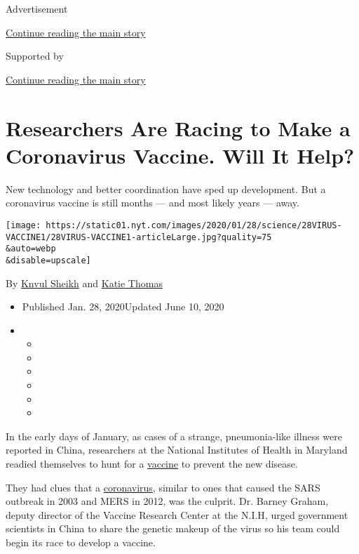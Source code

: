 Advertisement

\protect\hyperlink{after-top}{Continue reading the main story}

Supported by

\protect\hyperlink{after-sponsor}{Continue reading the main story}

\hypertarget{researchers-are-racing-to-make-a-coronavirus-vaccine-will-it-help}{%
\section{Researchers Are Racing to Make a Coronavirus Vaccine. Will It
Help?}\label{researchers-are-racing-to-make-a-coronavirus-vaccine-will-it-help}}

New technology and better coordination have sped up development. But a
coronavirus vaccine is still months --- and most likely years --- away.

\texttt{[image: https://static01.nyt.com/images/2020/01/28/science/28VIRUS-VACCINE1/28VIRUS-VACCINE1-articleLarge.jpg?quality=75\\\&auto=webp\\\&disable=upscale]}

By \href{https://www.nytimes.com/by/knvul-sheikh}{Knvul Sheikh} and
\href{https://www.nytimes.com/by/katie-thomas}{Katie Thomas}

\begin{itemize}
\item
  Published Jan. 28, 2020Updated June 10, 2020
\item
  \begin{itemize}
  \item
  \item
  \item
  \item
  \item
  \item
  \end{itemize}
\end{itemize}

In the early days of January, as cases of a strange, pneumonia-like
illness were reported in China, researchers at the National Institutes
of Health in Maryland readied themselves to hunt for a
\href{https://www.nytimes.com/2020/04/27/world/europe/coronavirus-vaccine-update-oxford.html}{vaccine}
to prevent the new disease.

They had clues that a
\href{https://www.nytimes.com/2020/04/27/world/europe/coronavirus-vaccine-update-oxford.html}{coronavirus},
similar to ones that caused the SARS outbreak in 2003 and MERS in 2012,
was the culprit. Dr. Barney Graham, deputy director of the Vaccine
Research Center at the N.I.H, urged government scientists in China to
share the genetic makeup of the virus so his team could begin its race
to develop a vaccine.

